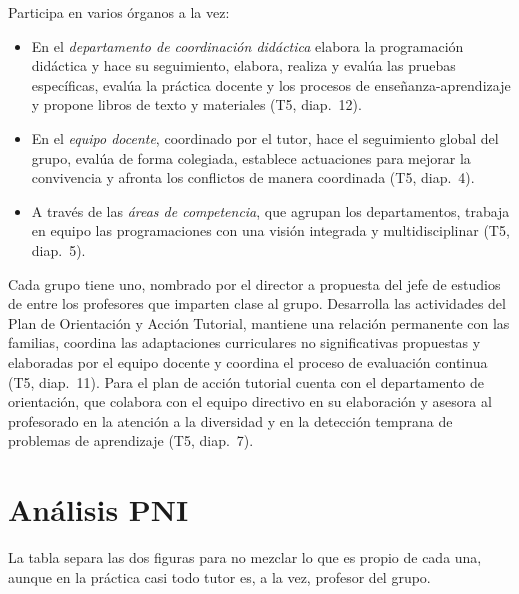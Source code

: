 \documentclass[11pt,a4paper]{article}
\begin{document}
\begin{description}[leftmargin=0pt, style=nextline]
  \item[El profesor] Participa en varios órganos a la vez:
  \begin{itemize}[itemsep=0pt, topsep=2pt]
    \item En el \emph{departamento de coordinación didáctica} elabora la
    programación didáctica y hace su seguimiento, elabora, realiza y evalúa
    las pruebas específicas, evalúa la práctica docente y los procesos de
    enseñanza-aprendizaje y propone libros de texto y materiales (T5,
    diap.~12).
    \item En el \emph{equipo docente}, coordinado por el tutor, hace el
    seguimiento global del grupo, evalúa de forma colegiada, establece
    actuaciones para mejorar la convivencia y afronta los conflictos de manera
    coordinada (T5, diap.~4).
    \item A través de las \emph{áreas de competencia}, que agrupan los
    departamentos, trabaja en equipo las programaciones con una visión
    integrada y multidisciplinar (T5, diap.~5).
  \end{itemize}
  \item[El tutor o tutora] Cada grupo tiene uno, nombrado por el director a
  propuesta del jefe de estudios de entre los profesores que imparten clase al
  grupo. Desarrolla las actividades del Plan de Orientación y Acción Tutorial,
  mantiene una relación permanente con las familias, coordina las adaptaciones
  curriculares no significativas propuestas y elaboradas por el equipo docente
  y coordina el proceso de evaluación continua (T5, diap.~11). Para el plan de
  acción tutorial cuenta con el departamento de orientación, que colabora con
  el equipo directivo en su elaboración y asesora al profesorado en la
  atención a la diversidad y en la detección temprana de problemas de
  aprendizaje (T5, diap.~7).
\end{description}

\section{Análisis PNI}

La tabla separa las dos figuras para no mezclar lo que es propio de cada una,
aunque en la práctica casi todo tutor es, a la vez, profesor del grupo.
\end{document}
